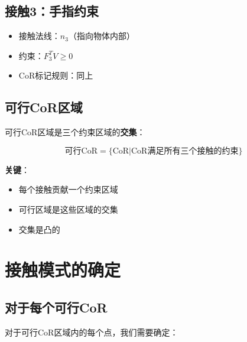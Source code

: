 \documentclass[12pt,a4paper]{article}
\begin{document}
\subsection{接触3：手指约束}

\begin{itemize}
\item 接触法线：$\hat{n}_3$（指向物体内部）
\item 约束：$F_3^T V \geq 0$
\item CoR标记规则：同上
\end{itemize}

\subsection{可行CoR区域}

可行CoR区域是三个约束区域的\textbf{交集}：

\begin{equation}
\text{可行CoR} = \{\text{CoR} | \text{CoR满足所有三个接触的约束}\}
\end{equation}

\textbf{关键}：
\begin{itemize}
\item 每个接触贡献一个约束区域
\item 可行区域是这些区域的交集
\item 交集是凸的
\end{itemize}

\section{接触模式的确定}

\subsection{对于每个可行CoR}

对于可行CoR区域内的每个点，我们需要确定：
\end{document}

